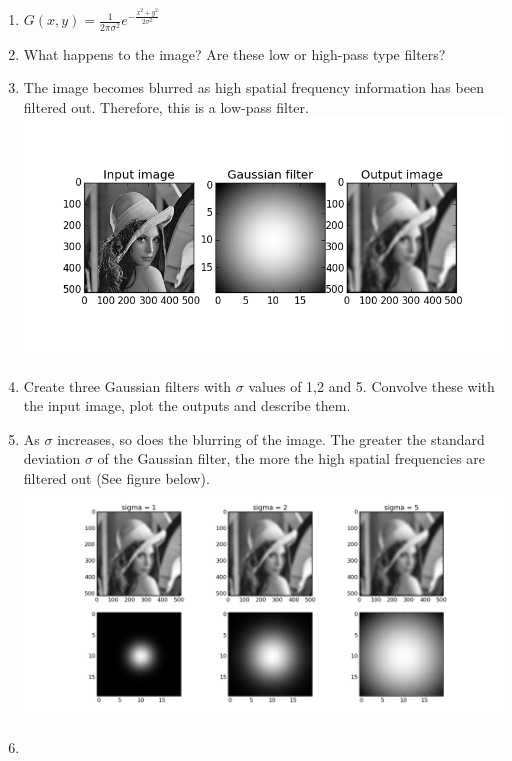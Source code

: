 \documentclass[12pt,english]{scrartcl}
\begin{document}
\begin{enumerate}
 \item[]
 \centering
 $G(x,y) = \frac{1}{2\pi\sigma^2} e^{-\frac{x^2+y^2}{2\sigma^2}}$ \\
 \raggedright
 
 \item What happens to the image? Are these low or high-pass type filters? \\
 \item[]
 \color{blue}
 The image becomes blurred as high spatial frequency information has been filtered out. Therefore, this is a low-pass filter. \\
\centering
 \includegraphics[scale=0.5]{task_1_1.png} 
 \color{black} 
 \raggedright
 \item  Create three Gaussian filters with $\sigma$ values of 1,2 and 5. Convolve these with the input image, plot the outputs and describe them. \\
 \color{blue}
 \item[]
 As $\sigma$ increases, so does the blurring of the image. The greater the standard deviation $\sigma$ of the Gaussian filter, the more the high spatial frequencies are filtered out (See figure below). \\
\centering
 \includegraphics[scale=0.4]{../Figures/Edge_detection/Answer_T1_2.png} 
 \item[]
 

\end{enumerate}
\end{document}
